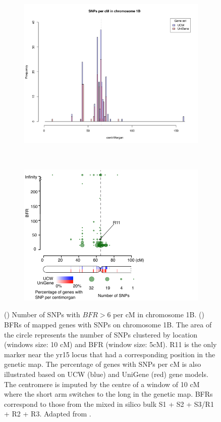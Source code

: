 \begin{figure}
  \centering
  \begin{subfigure}{0.6\textwidth}
  \caption{}
   \label{fig:yr15:snpsBFR6Chr1B}
   \includegraphics[width=1\textwidth]{Yr15/Figures/mapping/snpsBFR6crh1B.pdf}
  \end{subfigure}
  ~
  \begin{subfigure}{0.35\textwidth}
  \caption{}
   \label{fig:yr15:BFRValues1BS}
   \includegraphics[width=1\textwidth]{Yr15/Figures/mapping/BFRValues1BS.pdf}
  \end{subfigure}
\caption{() Number of SNPs with $BFR>6$ per cM in chromosome 1B. () BFRs of mapped genes with SNPs on chromosome 1B. The area of the circle represents the number of SNPs clustered by location (windows size: 10 cM) and BFR (window size: 5cM). R11 is the only marker near the \acrshort{yr15} locus that had a corresponding position in the genetic map. The percentage of genes with SNPs per cM is also illustrated based on UCW (blue) and UniGene (red) gene models. The centromere is imputed by the centre of a window of 10 cM where the short arm switches to the long in the genetic map. BFRs correspond to those from the mixed in silico bulk S1 + S2 + S3/R1 + R2 + R3. Adapted from \citep{Ramirez-Gonzalez2015b}.} 
\label{fig:yr15:chr1}
\end{figure}

